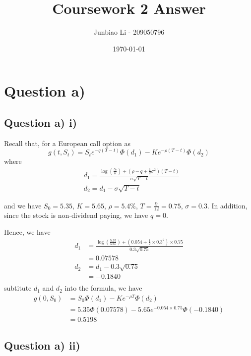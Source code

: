 \documentclass[12pt]{article}
\title{Coursework 2 Answer}
\author{Junbiao Li - 209050796}
\date{\today}
\begin{document}
\maketitle
\tableofcontents

\clearpage
\section{Question a)}

\subsection{Question a) i)}

Recall that, for a European call option as
\[
    g\left(t, S_t\right)=S_t e^{-q(T-t)} \Phi\left(d_1\right)-K e^{-\rho(T-t)}
    \Phi\left(d_2\right)
\]
where
\[
    \begin{aligned}
         & d_1=\frac{\log \left(\frac{S_t}{K}\right)+\left(\rho-q+\frac{1}{2}
            \sigma^2\right)(T-t)}{\sigma \sqrt{T-t}}
        \\
         & d_2=d_1-\sigma \sqrt{T-t}
    \end{aligned}
\]

and we have \(S_0=5.35\), \(K=5.65\), \(\rho=5.4\% \), \(T=\frac{9}{12}=0.75\),
\(\sigma=0.3\). In addition, since the stock is non-dividend paying, we have
\(q=0\).

Hence, we have
\[
    \begin{aligned}
        d_1 & = \frac{\log
            \left(\frac{5.35}{5.65}\right)+\left(0.054+\frac{1}{2} \times
            0.3^2\right)
        \times 0.75}{0.3 \sqrt{0.75}} \\
            & =0.07578                \\
        d_2 & = d_1 - 0.3 \sqrt{0.75} \\
            & = -0.1840               \\
    \end{aligned}
\]
subtitute \(d_1\) and \(d_2\) into the formula, we have
\[
    \begin{aligned}
        g(0, S_0) & = S_0 \Phi(d_1) - K e^{-\rho T} \Phi(d_2)
        \\
                  & = 5.35 \Phi(0.07578) - 5.65 e^{-0.054 \times 0.75}
        \Phi(-0.1840)                                                  \\
                  & =0.5198
    \end{aligned}
\]

\subsection{Question a) ii)}
\end{document}
